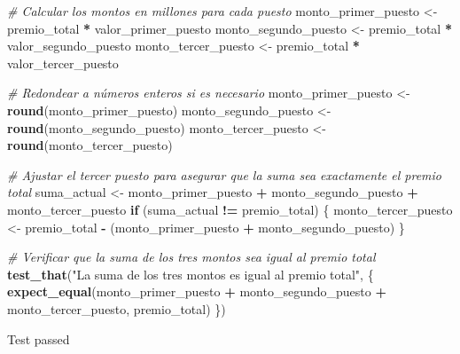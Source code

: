 \documentclass[
]{article}
\newenvironment{Shaded}{\begin{snugshade}}{\end{snugshade}}
\newcommand{\CommentTok}[1]{\textcolor[rgb]{0.56,0.35,0.01}{\textit{#1}}}
\newcommand{\ControlFlowTok}[1]{\textcolor[rgb]{0.13,0.29,0.53}{\textbf{#1}}}
\newcommand{\FunctionTok}[1]{\textcolor[rgb]{0.13,0.29,0.53}{\textbf{#1}}}
\newcommand{\NormalTok}[1]{#1}
\newcommand{\OtherTok}[1]{\textcolor[rgb]{0.56,0.35,0.01}{#1}}
\newcommand{\SpecialCharTok}[1]{\textcolor[rgb]{0.81,0.36,0.00}{\textbf{#1}}}
\newcommand{\StringTok}[1]{\textcolor[rgb]{0.31,0.60,0.02}{#1}}
\begin{document}
\begin{Shaded}
\begin{Highlighting}[]
\CommentTok{\# Calcular los montos en millones para cada puesto}
\NormalTok{monto\_primer\_puesto }\OtherTok{\textless{}{-}}\NormalTok{ premio\_total }\SpecialCharTok{*}\NormalTok{ valor\_primer\_puesto}
\NormalTok{monto\_segundo\_puesto }\OtherTok{\textless{}{-}}\NormalTok{ premio\_total }\SpecialCharTok{*}\NormalTok{ valor\_segundo\_puesto}
\NormalTok{monto\_tercer\_puesto }\OtherTok{\textless{}{-}}\NormalTok{ premio\_total }\SpecialCharTok{*}\NormalTok{ valor\_tercer\_puesto}

\CommentTok{\# Redondear a números enteros si es necesario}
\NormalTok{monto\_primer\_puesto }\OtherTok{\textless{}{-}} \FunctionTok{round}\NormalTok{(monto\_primer\_puesto)}
\NormalTok{monto\_segundo\_puesto }\OtherTok{\textless{}{-}} \FunctionTok{round}\NormalTok{(monto\_segundo\_puesto)}
\NormalTok{monto\_tercer\_puesto }\OtherTok{\textless{}{-}} \FunctionTok{round}\NormalTok{(monto\_tercer\_puesto)}

\CommentTok{\# Ajustar el tercer puesto para asegurar que la suma sea exactamente el premio total}
\NormalTok{suma\_actual }\OtherTok{\textless{}{-}}\NormalTok{ monto\_primer\_puesto }\SpecialCharTok{+}\NormalTok{ monto\_segundo\_puesto }\SpecialCharTok{+}\NormalTok{ monto\_tercer\_puesto}
\ControlFlowTok{if}\NormalTok{ (suma\_actual }\SpecialCharTok{!=}\NormalTok{ premio\_total) \{}
\NormalTok{  monto\_tercer\_puesto }\OtherTok{\textless{}{-}}\NormalTok{ premio\_total }\SpecialCharTok{{-}}\NormalTok{ (monto\_primer\_puesto }\SpecialCharTok{+}\NormalTok{ monto\_segundo\_puesto)}
\NormalTok{\}}

\CommentTok{\# Verificar que la suma de los tres montos sea igual al premio total}
\FunctionTok{test\_that}\NormalTok{(}\StringTok{"La suma de los tres montos es igual al premio total"}\NormalTok{, \{}
  \FunctionTok{expect\_equal}\NormalTok{(monto\_primer\_puesto }\SpecialCharTok{+}\NormalTok{ monto\_segundo\_puesto }\SpecialCharTok{+}\NormalTok{ monto\_tercer\_puesto, premio\_total)}
\NormalTok{\})}
\end{Highlighting}
\end{Shaded}

Test passed
\end{document}
